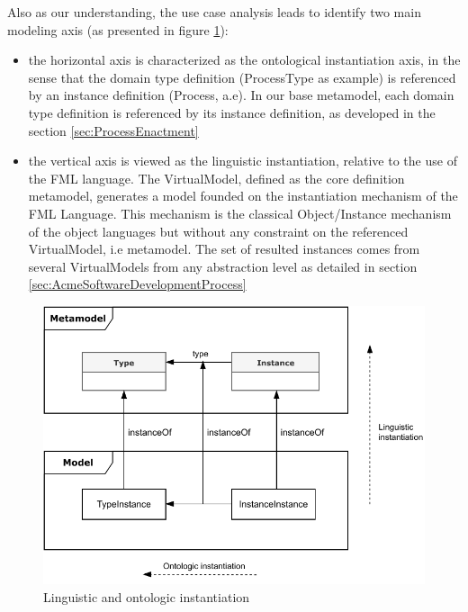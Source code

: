 Also as our understanding, the use case analysis leads to identify two main modeling axis (as presented in figure \ref{fig:LinguisticAndOntologicInstantiation}):
\begin{itemize}
    \item the horizontal axis is characterized as the ontological instantiation axis, in the sense that the domain type definition (ProcessType as example) is referenced by an instance definition (Process, a.e). In our base metamodel, each domain type definition is referenced by its instance definition, as developed in the section \ref{sec:ProcessEnactment}

\item the vertical axis is viewed as the linguistic instantiation, relative to the use of the FML language. The VirtualModel, defined as the core definition metamodel, generates a model founded on the instantiation mechanism of the FML Language. This mechanism is the classical Object/Instance mechanism of the object languages but without any constraint on the referenced VirtualModel, i.e metamodel. The set of resulted instances comes from several VirtualModels 
from any abstraction level as detailed in section \ref{sec:AcmeSoftwareDevelopmentProcess}


\end{itemize}

\begin{figure}
    \centering
    \includegraphics[width=1.0 \columnwidth]{Figures/Instantiation.pdf}
    \caption{Linguistic and ontologic instantiation}
    \label{fig:LinguisticAndOntologicInstantiation}
\end{figure}

